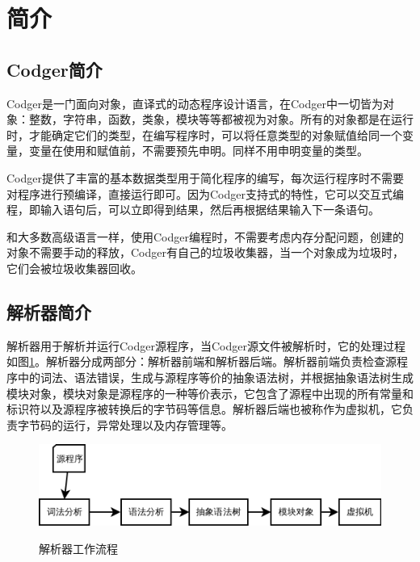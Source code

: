 

\section{简介}
\subsection{Codger简介}
Codger是一门面向对象，直译式的动态程序设计语言，在Codger中一切皆为对象：整数，字符串，函数，类象，模块等等都被视为对象。所有的对象都是在运行时，才能确定它们的类型，在编写程序时，可以将任意类型的对象赋值给同一个变量，变量在使用和赋值前，不需要预先申明。同样不用申明变量的类型。

Codger提供了丰富的基本数据类型用于简化程序的编写，每次运行程序时不需要对程序进行预编译，直接运行即可。因为Codger支持式的特性，它可以交互式编程，即输入语句后，可以立即得到结果，然后再根据结果输入下一条语句。

和大多数高级语言一样，使用Codger编程时，不需要考虑内存分配问题，创建的对象不需要手动的释放，Codger有自己的垃圾收集器，当一个对象成为垃圾时，它们会被垃圾收集器回收。



\subsection{解析器简介}
解析器用于解析并运行Codger源程序，当Codger源文件被解析时，它的处理过程如图\ref{fig:fileprocess}。解析器分成两部分：解析器前端和解析器后端。解析器前端负责检查源程序中的词法、语法错误，生成与源程序等价的抽象语法树，并根据抽象语法树生成模块对象，模块对象是源程序的一种等价表示，它包含了源程中出现的所有常量和标识符以及源程序被转换后的字节码等信息。解析器后端也被称作为虚拟机，它负责字节码的运行，异常处理以及内存管理等。


\begin{figure}
\centering
\includegraphics[scale=0.8]{file_process.png}
\label{fig:fileprocess}
\caption{解析器工作流程} 
\end{figure}


